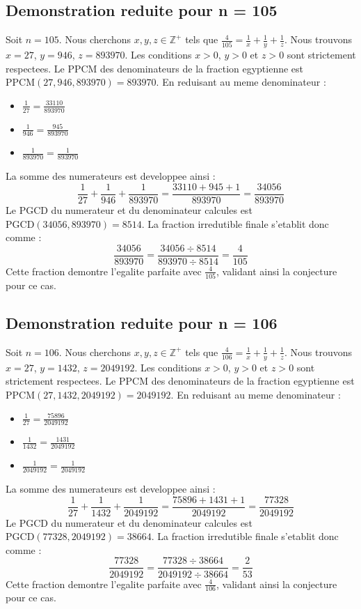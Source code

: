 \documentclass[11pt,a4paper]{article}
\begin{document}
\subsection{Demonstration reduite pour n = 105}
Soit $n = 105$. Nous cherchons $x, y, z \in \mathbb{Z}^{+}$ tels que $\frac{4}{105} = \frac{1}{x} + \frac{1}{y} + \frac{1}{z}$.
Nous trouvons $x = 27$, $y = 946$, $z = 893970$.
Les conditions $x > 0$, $y > 0$ et $z > 0$ sont strictement respectees.
Le PPCM des denominateurs de la fraction egyptienne est $\text{PPCM}(27, 946, 893970) = 893970$.
En reduisant au meme denominateur :
\begin{itemize}
    \item $\frac{1}{27} = \frac{33110}{893970}$
    \item $\frac{1}{946} = \frac{945}{893970}$
    \item $\frac{1}{893970} = \frac{1}{893970}$
\end{itemize}
La somme des numerateurs est developpee ainsi :
$$ \frac{1}{27} + \frac{1}{946} + \frac{1}{893970} = \frac{33110 + 945 + 1}{893970} = \frac{34056}{893970} $$
Le PGCD du numerateur et du denominateur calcules est $\text{PGCD}(34056, 893970) = 8514$.
La fraction irredutible finale s'etablit donc comme :
$$ \frac{34056}{893970} = \frac{34056 \div 8514}{893970 \div 8514} = \frac{4}{105} $$
Cette fraction demontre l'egalite parfaite avec $\frac{4}{105}$, validant ainsi la conjecture pour ce cas.

\subsection{Demonstration reduite pour n = 106}
Soit $n = 106$. Nous cherchons $x, y, z \in \mathbb{Z}^{+}$ tels que $\frac{4}{106} = \frac{1}{x} + \frac{1}{y} + \frac{1}{z}$.
Nous trouvons $x = 27$, $y = 1432$, $z = 2049192$.
Les conditions $x > 0$, $y > 0$ et $z > 0$ sont strictement respectees.
Le PPCM des denominateurs de la fraction egyptienne est $\text{PPCM}(27, 1432, 2049192) = 2049192$.
En reduisant au meme denominateur :
\begin{itemize}
    \item $\frac{1}{27} = \frac{75896}{2049192}$
    \item $\frac{1}{1432} = \frac{1431}{2049192}$
    \item $\frac{1}{2049192} = \frac{1}{2049192}$
\end{itemize}
La somme des numerateurs est developpee ainsi :
$$ \frac{1}{27} + \frac{1}{1432} + \frac{1}{2049192} = \frac{75896 + 1431 + 1}{2049192} = \frac{77328}{2049192} $$
Le PGCD du numerateur et du denominateur calcules est $\text{PGCD}(77328, 2049192) = 38664$.
La fraction irredutible finale s'etablit donc comme :
$$ \frac{77328}{2049192} = \frac{77328 \div 38664}{2049192 \div 38664} = \frac{2}{53} $$
Cette fraction demontre l'egalite parfaite avec $\frac{4}{106}$, validant ainsi la conjecture pour ce cas.
\end{document}
